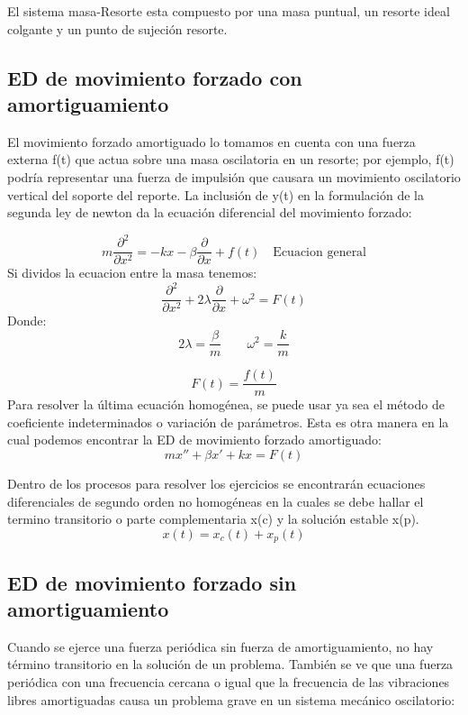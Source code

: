 \documentclass[12pt,a4paper]{article}
\begin{document}
	El sistema masa-Resorte esta compuesto por una masa puntual, un resorte ideal colgante y un punto de sujeción resorte. \cite{01}
	
	
	\subsection{ED de movimiento forzado con amortiguamiento}
	
	El movimiento forzado amortiguado lo tomamos en cuenta con una fuerza externa f(t) que actua sobre una masa oscilatoria en un resorte; por ejemplo, f(t) podría representar una fuerza de impulsión que causara un movimiento oscilatorio vertical del soporte del reporte. La inclusión de y(t) en la formulación de la segunda ley de newton da la ecuación diferencial del movimiento forzado:
	
	\begin{equation}
	m\frac{\partial^2 }{\partial x^2}= -kx-\beta \frac{\partial }{\partial x}+f(t)\quad\text{Ecuacion general}
		\end{equation}
	Si dividos la ecuacion entre la masa tenemos:
	\begin{equation}
	\frac{\partial^2 }{\partial x^2}+2\lambda\frac{\partial }{\partial x} +\omega^2=F(t)
	\end{equation}
	Donde:
	\begin{equation}
	2\lambda =\frac{\beta}{m} \quad\quad\omega^2=\frac{k}{m}
	\end{equation}
	
	\begin{equation}
	F(t)=\frac{f(t)}{m}
	\end{equation}
	Para resolver la última ecuación homogénea, se puede usar ya sea el método de coeficiente indeterminados o variación de parámetros. 
	\vfill
	Esta es otra manera en la cual podemos encontrar la ED de movimiento forzado amortiguado:
	\begin{equation}
mx''+\beta x'+kx=F(t)	
	\end{equation}
	
	Dentro de los procesos para resolver los ejercicios se encontrarán ecuaciones diferenciales de segundo orden no homogéneas en la cuales se debe hallar el termino transitorio o parte complementaria x(c) y la solución estable x(p).
	\begin{equation}
	x(t)=x_{c}(t)+x_{p}(t)
	\end{equation}
	
	\subsection{ED de movimiento forzado sin amortiguamiento}
	Cuando se ejerce una fuerza periódica sin fuerza de amortiguamiento, no hay término transitorio en la solución de un problema. También se ve que una fuerza periódica con una frecuencia cercana o igual que la frecuencia de las vibraciones libres amortiguadas causa un problema grave en un sistema mecánico oscilatorio:\\
	
\end{document}

